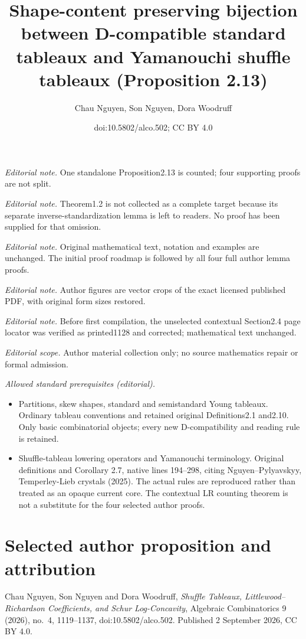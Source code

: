 \documentclass[10pt,a4paper]{article}
\title{Shape-content preserving bijection between D-compatible standard tableaux and Yamanouchi shuffle tableaux (Proposition 2.13)}
\author{Chau Nguyen, Son Nguyen, Dora Woodruff}
\date{doi:10.5802/alco.502; CC BY 4.0}
\theoremstyle{definition}
\numberwithin{equation}{section}
\begin{document}
\maketitle
\noindent\textit{Editorial note.} One standalone Proposition2.13 is counted; four supporting proofs are not split.\par\medskip
\noindent\textit{Editorial note.} Theorem1.2 is not collected as a complete target because its separate inverse-standardization lemma is left to readers. No proof has been supplied for that omission.\par\medskip
\noindent\textit{Editorial note.} Original mathematical text, notation and examples are unchanged. The initial proof roadmap is followed by all four full author lemma proofs.\par\medskip
\noindent\textit{Editorial note.} Author figures are vector crops of the exact licensed published PDF, with original form sizes restored.\par\medskip
\noindent\textit{Editorial note.} Before first compilation, the unselected contextual Section2.4 page locator was verified as printed1128 and corrected; mathematical text unchanged.\par\medskip
\noindent\textit{Editorial scope.} Author material collection only; no source mathematics repair or formal admission.\par\medskip
\noindent\textit{Allowed standard prerequisites (editorial).}\begin{itemize}
\item Partitions, skew shapes, standard and semistandard Young tableaux. Ordinary tableau conventions and retained original Definitions2.1 and2.10. Only basic combinatorial objects; every new D-compatibility and reading rule is retained.
\item Shuffle-tableau lowering operators and Yamanouchi terminology. Original definitions and Corollary 2.7, native lines 194–298, citing Nguyen–Pylyavskyy, Temperley-Lieb crystals (2025). The actual rules are reproduced rather than treated as an opaque current core. The contextual LR counting theorem is not a substitute for the four selected author proofs.
\end{itemize}\medskip
\section*{Selected author proposition and attribution}
Chau Nguyen, Son Nguyen and Dora Woodruff, \emph{Shuffle Tableaux, Littlewood--Richardson Coefficients, and Schur Log-Concavity}, Algebraic Combinatorics 9 (2026), no.~4, 1119--1137, doi:10.5802/alco.502. Published 2 September 2026, CC BY 4.0.
\end{document}
